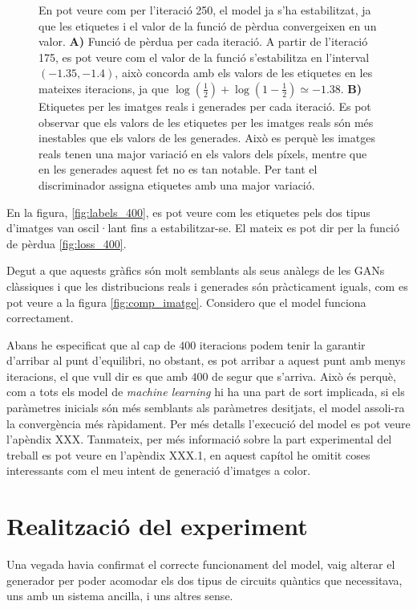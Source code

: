 \begin{figure}
	\caption{En pot veure com per l'iteració 250, el model ja s'ha estabilitzat, ja que les etiquetes i el valor de la funció de pèrdua convergeixen en un valor. \textbf{A)} Funció de pèrdua per cada iteració. A partir de l'iteració 175, es pot veure com el valor de la funció s'estabilitza en l'interval $(-1.35, -1.4)$, això concorda amb els valors de les etiquetes en les mateixes iteracions, ja que $\log(\frac{1}{2}) + \log(1-\frac{1}{2}) \simeq -1.38$. \textbf{B)} Etiquetes per les imatges reals i generades per cada iteració. Es pot observar que els valors de les etiquetes per les imatges reals són més inestables que els valors de les generades. Això es perquè les imatges reals tenen una major variació en els valors dels píxels, mentre que en les generades aquest fet no es tan notable. Per tant el discriminador assigna etiquetes amb una major variació.}
\end{figure}

En la figura, \ref{fig:labels_400}, es pot veure com les etiquetes pels dos tipus d'imatges van oscil·lant fins a estabilitzar-se. El mateix es pot dir per la funció de pèrdua \ref{fig:loss_400}.  

Degut a que aquests gràfics són molt semblants als seus anàlegs de les GANs clàssiques i que les distribucions reals i generades són pràcticament iguals, com es pot veure a la figura \ref{fig:comp_imatge}. Considero que el model funciona correctament. 



Abans he especificat que al cap de $400$ iteracions podem tenir la garantir d'arribar al punt d'equilibri, no obstant, es pot arribar a aquest punt amb menys iteracions, el que vull dir es que amb $400$ de segur que s'arriva. Això és perquè, com a tots els model de \textit{machine learning} hi ha una part de sort implicada, si els paràmetres inicials són més semblants als paràmetres desitjats, el model assoli-ra la convergència més ràpidament. Per més detalls l'execució del model es pot veure l'apèndix XXX. Tanmateix, per més informació sobre la part experimental del treball es pot veure en l'apèndix XXX.1, en aquest capítol he omitit coses interessants com el meu intent de generació d'imatges a color. 
 
\chapter{Realització del experiment} 

Una vegada havia confirmat el correcte funcionament del model, vaig alterar el generador per poder acomodar els dos tipus de circuits quàntics que necessitava, uns amb un sistema ancilla, i uns altres sense.

